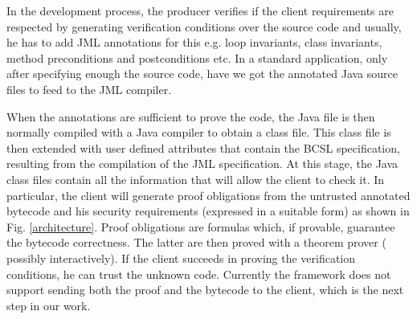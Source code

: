 In the development process, the producer verifies if the client requirements are respected by generating verification conditions
over the source code and usually, he has to add JML annotations for this e.g. loop invariants, class invariants, method preconditions
 and postconditions etc. In a standard application, only after specifying enough the source code, 
have we got the annotated Java source files to feed to the JML compiler.



When the annotations are sufficient to prove the code, 
the Java file is then normally compiled with a Java compiler to obtain a 
class file. This class file is then extended with user defined attributes that contain the BCSL specification, resulting from the compilation of the JML specification. 
At this stage, the Java class files contain all the information that will allow the client to check it. 
In particular, the client will generate proof obligations from the untrusted annotated bytecode and his security requirements 
(expressed in a suitable form) as shown in Fig. \ref{architecture}. Proof obligations are formulas which, if provable, guarantee the bytecode correctness.
The latter are then proved with a theorem prover ( possibly interactively). If the client succeeds in proving 
the verification conditions, he can trust the unknown code. Currently the framework does not support sending both the proof and the 
bytecode to the client, which is the next step in our work.


